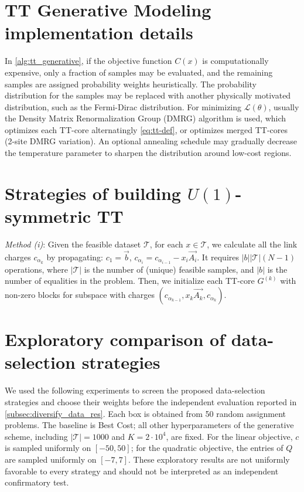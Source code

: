 \documentclass{article}
\theoremstyle{plain}
\theoremstyle{definition}
\theoremstyle{remark}
\begin{document}



\newpage
\appendix
\onecolumn

\section{TT Generative Modeling implementation details}
\label{app:sec:implement_vars}
In \cref{alg:tt_generative}, if the objective function $C(x)$ is computationally expensive, only a fraction of samples may be evaluated, and the remaining samples are assigned probability weights heuristically. The probability distribution for the samples may be replaced with another physically motivated distribution, such as the Fermi-Dirac distribution. For minimizing $\mathcal{L}(\theta)$, usually the Density Matrix Renormalization Group (DMRG) algorithm is used, which optimizes each TT-core alternatingly \eqref{eq:tt-def}, or optimizes merged TT-cores (2-site DMRG variation). An optional annealing schedule may gradually decrease the temperature parameter to sharpen the distribution around low-cost regions. 

\section{Strategies of building $U(1)$-symmetric TT}
\label{app:sec:method1}

\textit{Method (i)}: Given the feasible dataset $\mathcal{T}$, for each $x\in \mathcal{T}$, we calculate all the link charges $c_{\alpha_k}$ by propagating: $c_{1} = \vec{b}$, $c_{\alpha_{i}} = c_{\alpha_{i-1}}-x_i\vec{A_i}$. It requires $|b||\mathcal{T}| (N-1)$ operations, where $|\mathcal{T}|$ is the number of (unique) feasible samples, and $|b|$ is the number of equalities in the problem. Then, we initialize each TT-core $G^{(k)}$ with non-zero blocks for subspace with charges $(c_{\alpha_{k-1}}, x_k \vec{A_k}, c_{\alpha_k})$.

\section{Exploratory comparison of data-selection strategies}
\label{app:selection_strategy_screening}

We used the following experiments to screen the proposed data-selection strategies and choose their weights before the independent evaluation reported in \cref{subsec:diversify_data_res}. Each box is obtained from 50 random assignment problems. The baseline is Best Cost; all other hyperparameters of the generative scheme, including $|\mathcal{T}|=1000$ and $K=2\cdot10^4$, are fixed. For the linear objective, $c$ is sampled uniformly on $[-50,50]$; for the quadratic objective, the entries of $Q$ are sampled uniformly on $[-7,7]$. These exploratory results are not uniformly favorable to every strategy and should not be interpreted as an independent confirmatory test.
\end{document}
